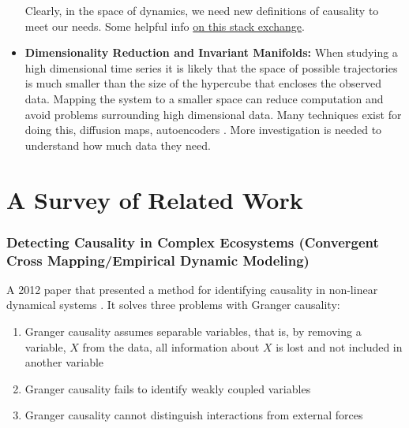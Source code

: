 \documentclass{article}
\begin{document}
\begin{itemize}
            Clearly, in the space of dynamics, we need new definitions of causality to meet our needs. Some helpful info
            \href{https://stats.stackexchange.com/questions/26300/does-causation-imply-correlation#:~:text=The%20strict%20answer%20is%20%22no,does%20not%20necessarily%20imply%20correlation%22.&text=using%20the%20property%20of%20the,correlation%20is%20equal%20to%20zero.}
            {on this stack exchange}.

            \item \textbf{Dimensionality Reduction and Invariant Manifolds:} When studying a high dimensional time series
            it is likely that the space of possible trajectories is much smaller than the size of the hypercube that encloses
            the observed data. Mapping the system to a smaller space can reduce computation and avoid problems
            surrounding high dimensional data. Many techniques exist for doing this, diffusion maps, autoencoders
            \cite{lee2020model, dsilva2018parsimonious}. More investigation is needed to understand how much data they need.
         
        \end{itemize}


\section*{A Survey of Related Work}

    \subsubsection*{Detecting Causality in Complex Ecosystems (Convergent Cross Mapping/Empirical Dynamic Modeling)}

        A 2012 paper that presented a method for identifying causality in non-linear dynamical
        systems \cite{sugihara2012detecting}. It solves three problems with Granger causality: 
        \begin{enumerate}
            \item Granger causality assumes separable variables, that is, by removing a variable,
            $X$ from the data, all information about $X$ is lost and not included in another variable
            \item Granger causality fails to identify weakly coupled variables
            \item Granger causality cannot distinguish interactions from external forces
        \end{enumerate}
\end{document}

